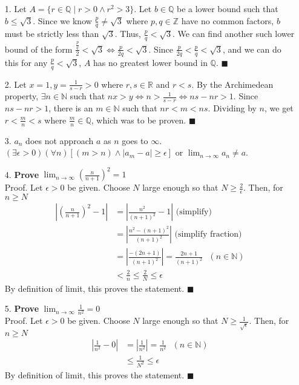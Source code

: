 \documentclass[11pt]{exam}
\author{@dante}
\begin{document}

\begin{enumerate}[leftmargin=0pt]

\item[1.] Let $A = \{r \in \mathbb{Q} \mid r > 0 \land r^2 > 3\}$. Let $b \in \mathbb{Q}$ be a lower bound such that $b \leq \sqrt{3}$. Since we know $\frac{p}{q} \neq \sqrt{3}$ where $p, q \in \mathbb{Z}$ have no common factors, $b$ must be strictly less than $\sqrt{3}$. Thus, $\frac{p}{q} < \sqrt{3}$. We can find another such lower bound of the form $\frac{\frac{p}{q}}{2} < \sqrt{3} \Leftrightarrow \frac{p}{2q} < \sqrt{3}$. Since $\frac{p}{2q} < \frac{p}{q} < \sqrt{3}$, and we can do this for any $\frac{p}{q} < \sqrt{3}$, $A$ has no greatest lower bound in $\mathbb{Q}$. $\blacksquare$

\item[2.] Let $x = 1, y = \frac{1}{s - r} > 0$ where $r, s \in \mathbb{R}$ and $r < s$. By the Archimedean property, $\exists n \in \mathbb{N}$ such that $nx > y \Leftrightarrow n > \frac{1}{s - r} \Leftrightarrow ns - nr > 1$. Since $ns - nr > 1$, there is an $m \in \mathbb{N}$ such that $nr < m < ns$. Dividing by $n$, we get $r < \frac{m}{n} < s$ where $\frac{m}{n} \in \mathbb{Q}$, which was to be proven. $\blacksquare$

\item[3.] $a_n$ does not approach $a$ as $n$ goes to $\infty$. $(\exists \epsilon > 0)(\forall n)[(m > n) \land |a_m - a| \geq \epsilon]$ or $\lim_{n \to \infty} a_n \neq a$.

\item[4.] \textbf{Prove} $\lim_{n \to \infty} (\frac{n}{n + 1})^2 = 1$ \\
Proof. Let $\epsilon > 0$ be given. Choose $N$ large enough so that $N \geq \frac{2}{\epsilon}$. Then, for $n \geq N$
\begin{align*}
    |(\frac{n}{n + 1})^2 - 1| &= |\frac{n^2}{(n + 1)^2} - 1| \text{ (simplify)} \\
    &= |\frac{n^2 - (n + 1)^2}{(n + 1)^2}| \text{ (simplify fraction)} \\
    &= |\frac{-(2n + 1)}{(n + 1)^2}| = \frac{2n + 1}{(n + 1)^2} \text{ $(n \in \mathbb{N})$} \\
    &< \frac{2}{n} \leq \frac{2}{N} \leq \epsilon
\end{align*}
By definition of limit, this proves the statement. $\blacksquare$

\item[5.] \textbf{Prove} $\lim_{n \to \infty} \frac{1}{n^2} = 0$ \\
Proof. Let $\epsilon > 0$ be given. Choose $N$ large enough so that $N \geq \frac{1}{\sqrt{\epsilon}}$. Then, for $n \geq N$
\begin{align*}
    |\frac{1}{n^2} - 0| &= |\frac{1}{n^2}| = \frac{1}{n^2} \text{ $(n \in \mathbb{N})$} \\
    &\leq \frac{1}{N^2} \leq \epsilon
\end{align*}
By definition of limit, this proves the statement. $\blacksquare$


\end{enumerate}
\end{document}
